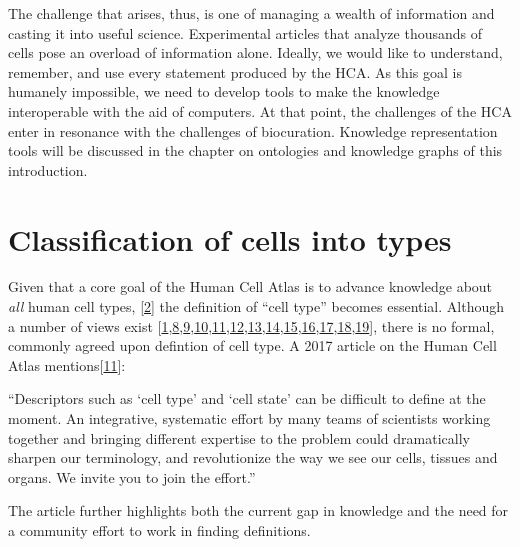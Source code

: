 The challenge that arises, thus, is one of managing a wealth of information and casting it into useful science.
Experimental articles that analyze thousands of cells pose an overload of information alone.
Ideally, we would like to understand, remember, and use every statement produced by the HCA.
As this goal is humanely impossible, we need to develop tools to make the knowledge interoperable with the aid of computers.
At that point, the challenges of the HCA enter in resonance with the challenges of biocuration.
Knowledge representation tools will be discussed in the chapter on ontologies and knowledge graphs of this introduction.

\hypertarget{classification-of-cells-into-types}{%
\section{Classification of cells into types}\label{classification-of-cells-into-types}}

Given that a core goal of the Human Cell Atlas is to advance knowledge about \emph{all} human cell types, {[}\protect\hyperlink{ref-1GmbExweg}{2}{]} the definition of ``cell type'' becomes essential.
Although a number of views exist {[}\protect\hyperlink{ref-pNGap1Du}{1},\protect\hyperlink{ref-paKiKTRS}{8},\protect\hyperlink{ref-sWv3okaH}{9},\protect\hyperlink{ref-19yYJWEkz}{10},\protect\hyperlink{ref-BlxFp1v3}{11},\protect\hyperlink{ref-eOUB1Bmj}{12},\protect\hyperlink{ref-TupzTvtA}{13},\protect\hyperlink{ref-w0Woz7JE}{14},\protect\hyperlink{ref-srfuRMe}{15},\protect\hyperlink{ref-1GXQByEaQ}{16},\protect\hyperlink{ref-k0Pe9YOB}{17},\protect\hyperlink{ref-MoaYZAA0}{18},\protect\hyperlink{ref-WAeCfntu}{19}{]}, there is no formal, commonly agreed upon defintion of cell type.
A 2017 article on the Human Cell Atlas mentions{[}\protect\hyperlink{ref-BlxFp1v3}{11}{]}:

``Descriptors such as `cell type' and `cell state' can be difficult to define at the moment. An integrative, systematic effort by many teams of scientists working together and bringing different expertise to the problem could dramatically sharpen our terminology, and revolutionize the way we see our cells, tissues and organs. We invite you to join the effort.''

The article further highlights both the current gap in knowledge and the need for a community effort to work in finding definitions.

